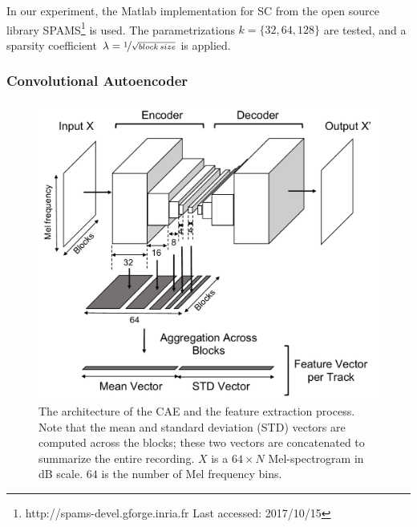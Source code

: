 \documentclass{ws-ijsc}
\begin{document}
In our experiment, the Matlab implementation for SC from the open source library SPAMS\footnote{http://spams-devel.gforge.inria.fr Last accessed: 2017/10/15} \cite{Mairal2009a} is used. The parametrizations $k = \{32, 64, 128\}$ are tested, and a sparsity coefficient $\lambda = \nicefrac{1}{\sqrt{block\, size}}$ is applied. 


\subsubsection{Convolutional Autoencoder}
\label{subsubsec:cae}

\begin{figure}
    \centering
    \includegraphics[width = 0.8 \linewidth]{./figs/cae.pdf}
    \caption{The architecture of the CAE and the feature extraction process. Note that the mean and standard deviation (STD) vectors are computed across the blocks; these two vectors are concatenated to summarize the entire recording. $X$ is a $64 \times N$ Mel-spectrogram in dB scale. $64$ is the number of Mel frequency bins.} 
    \label{fig:cae}
\end{figure}
\end{document}
